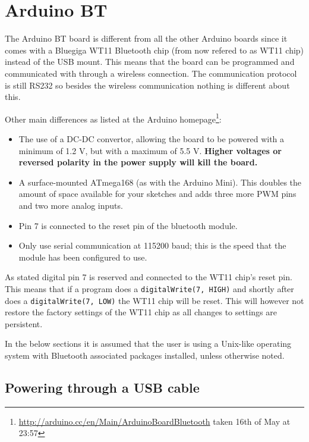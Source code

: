 \documentclass[a4paper, oneside, final]{memoir}
\begin{document}
\section{Arduino BT}

The Arduino BT board is different from all the other Arduino boards since it
comes with a Bluegiga WT11 Bluetooth chip (from now refered to as WT11 chip)
instead of the USB mount. This means that the board can be programmed and
communicated with through a wireless connection. The communication protocol is
still RS232 so besides the wireless communication nothing is different about
this.

Other main differences as listed at the Arduino
homepage\footnote{\url{http://arduino.cc/en/Main/ArduinoBoardBluetooth} taken
  16th of May at 23:57}:

\begin{itemize}
\item The use of a DC-DC convertor, allowing the board to be powered with a
  minimum of 1.2 V, but with a maximum of 5.5 V. \textbf{Higher voltages or
    reversed polarity in the power supply will kill the board.}

\item A surface-mounted ATmega168 (as with the Arduino Mini). This doubles the
  amount of space available for your sketches and adds three more PWM pins and
  two more analog inputs.

\item Pin 7 is connected to the reset pin of the bluetooth module. 

\item Only use serial communication at 115200 baud; this is the speed that the
  module has been configured to use.
\end{itemize}

As stated digital pin 7 is reserved and connected to the WT11 chip's reset
pin. This means that if a program does a \texttt{digitalWrite(7, HIGH)} and
shortly after does a \texttt{digitalWrite(7, LOW)} the WT11 chip will be
reset. This will however not restore the factory settings of the WT11 chip as
all changes to settings are persistent.

In the below sections it is assumed that the user is using a Unix-like operating
system with Bluetooth associated packages installed, unless otherwise noted.

\subsection{Powering through a USB  cable}
\end{document}
